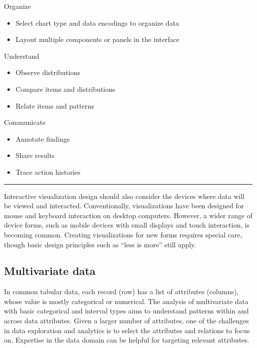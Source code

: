 \documentclass[]{krantz}
\providecommand{\tightlist}{%
  \setlength{\itemsep}{0pt}\setlength{\parskip}{0pt}}
\begin{document}
Organize

\begin{itemize}
\tightlist
\item
  Select chart type and data encodings to organize data
\item
  Layout multiple components or panels in the interface
\end{itemize}

Understand

\begin{itemize}
\tightlist
\item
  Observe distributions
\item
  Compare items and distributions
\item
  Relate items and patterns
\end{itemize}

Communicate

\begin{itemize}
\tightlist
\item
  Annotate findings
\item
  Share results
\item
  Trace action histories
\end{itemize}

\begin{center}\rule{0.5\linewidth}{\linethickness}\end{center}

Interactive visualization design should also consider the devices where
data will be viewed and interacted. Conventionally, visualizations have
been designed for mouse and keyboard interaction on desktop computers.
However, a wider range of device forms, such as mobile devices with
small displays and touch interaction, is becoming common. Creating
visualizations for new forms requires special care, though basic design
principles such as ``less is more'' still apply.

\subsection{Multivariate data}\label{sec:viz-2.1}

In common tabular data, each record (row) has a list of attributes
(columns), whose value is mostly categorical or numerical. The analysis
of multivariate data with basic categorical and interval types aims to
understand patterns within and across data attributes. Given a larger
number of attributes, one of the challenges in data exploration and
analytics is to select the attributes and relations to focus on.
Expertise in the data domain can be helpful for targeting relevant
attributes.
\end{document}
